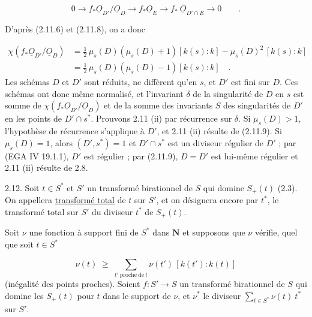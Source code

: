 \begin{equation*}
0 \longrightarrow f_*\underline{O}_{D'}/\underline{O}_D \longrightarrow f_*\underline{O}_E \longrightarrow f_*\ \underline{O}_{D'\cap E} \longrightarrow 0 \qquad .
\end{equation*}


D'après (2.11.6) et (2.11.8), on a donc

\begin{equation}\tag{2.11.9}
\begin{aligned}
\chi(f_*\underline{O}_{D'}/\underline{O}_D) &= \frac{1}{2}\,\mu_s(D)(\mu_s(D)+1)[k(s): k] - \mu_s(D)^2\,[k(s) : k] \\
&= \frac{1}{2}\,\mu_s(D)(\mu_s(D)-1)[k(s) : k] \quad .
\end{aligned}
\end{equation}
Les schémas $D$ et $D'$ sont réduits, ne diffèrent qu'en $s$, et $D'$ est fini sur $D$. Ces schémas ont donc même normalisé, et l'invariant $\delta$ de la singularité de $D$ en $s$ est somme de $\chi(f_*\underline{O}_{D'}/\underline{O}_D)$ et de la somme des invariants $S$ des singularités de $D'$ en les points de $D' \cap s^*$. Prouvons 2.11 (ii) par récurrence sur $\delta$. Si $\mu_s(D) > 1$, l'hypothèse de récurrence s'applique à $D'$, et 2.11 (ii) résulte de (2.11.9). Si $\mu_s(D) = 1$, alors $(D',s^*) = 1$ et $D' \cap s^*$ est un diviseur régulier de $D'$ ; par (EGA IV 19.1.1), $D'$ est régulier ; par (2.11.9), $D = D'$ est lui-même régulier et 2.11 (ii) résulte de 2.8.

2.12. Soit $t \in S^*$ et $S'$ un transformé birationnel de $S$ qui domine $S_+(t)$ (2.3). On appellera \underline{transformé total} de $t$ sur $S'$, et on désignera encore par $t^*$, le transformé total sur $S'$ du diviseur $t^*$ de $S_+(t)$.

Soit $\nu$ une fonction à support fini de $S^*$ dans $\mathbf{N}$ et supposons que $\nu$ vérifie, quel que soit $t \in S^*$

\begin{equation}\tag{2.12.1}
\nu(t) \;\geq\; \sum_{t' \ \mathrm{proche\ de}\ t} \nu(t')\,[k(t') : k(t)]
\end{equation}
(inégalité des points proches). Soient $f : S' \longrightarrow S$ un transformé birationnel de $S$ qui domine les $S_+(t)$ pour $t$ dans le support de $\nu$, et $\nu^*$ le diviseur $\sum_{t \in S^*} \nu(t)\ t^*$ sur $S'$.



